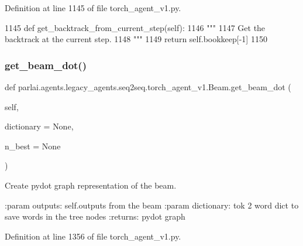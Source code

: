 Definition at line 1145 of file torch\+\_\+agent\+\_\+v1.\+py.


\begin{DoxyCode}
1145     \textcolor{keyword}{def }get\_backtrack\_from\_current\_step(self):
1146         \textcolor{stringliteral}{"""}
1147 \textcolor{stringliteral}{        Get the backtrack at the current step.}
1148 \textcolor{stringliteral}{        """}
1149         \textcolor{keywordflow}{return} self.bookkeep[-1]
1150 
\end{DoxyCode}
\mbox{\label{classparlai_1_1agents_1_1legacy__agents_1_1seq2seq_1_1torch__agent__v1_1_1Beam_af4d7c9fd1fd93f59148fe7ab90c58da9}} 
\subsubsection{\texorpdfstring{get\+\_\+beam\+\_\+dot()}{get\_beam\_dot()}}
{\footnotesize\ttfamily def parlai.\+agents.\+legacy\+\_\+agents.\+seq2seq.\+torch\+\_\+agent\+\_\+v1.\+Beam.\+get\+\_\+beam\+\_\+dot (\begin{DoxyParamCaption}\item[{}]{self,  }\item[{}]{dictionary = {\ttfamily None},  }\item[{}]{n\+\_\+best = {\ttfamily None} }\end{DoxyParamCaption})}

\begin{DoxyVerb}Create pydot graph representation of the beam.

:param outputs: self.outputs from the beam
:param dictionary: tok 2 word dict to save words in the tree nodes
:returns: pydot graph
\end{DoxyVerb}
 

Definition at line 1356 of file torch\+\_\+agent\+\_\+v1.\+py.


